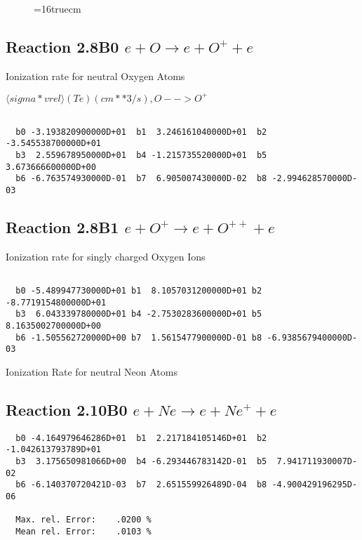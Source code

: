 \documentclass[12pt,dvipdfmx]{article}
\begin{document}
\begin{figure} \label{2.7B0}
\epsfxsize=16truecm
\end{figure}
\newpage

\subsection{
Reaction 2.8B0   $e + O \rightarrow e + O^+ + e  $
}

  Ionization rate for neutral Oxygen Atoms

  $ \langle sigma*vrel \rangle(Te)  (cm**3/s), O --> O^+$

\begin{small}\begin{verbatim}

  b0 -3.193820900000D+01  b1  3.246161040000D+01  b2 -3.545538700000D+01
  b3  2.559678950000D+01  b4 -1.215735520000D+01  b5  3.673666600000D+00
  b6 -6.763574930000D-01  b7  6.905007430000D-02  b8 -2.994628570000D-03

\end{verbatim}\end{small}
\subsection{
Reaction 2.8B1   $e + O^+ \rightarrow e + O^{++} + e  $
}

  Ionization rate for singly charged Oxygen Ions


\begin{small}\begin{verbatim}

  b0 -5.489947730000D+01 b1  8.1057031200000D+01 b2 -8.7719154800000D+01
  b3  6.043339780000D+01 b4 -2.7530283600000D+01 b5  8.1635002700000D+00
  b6 -1.505562720000D+00 b7  1.5615477900000D-01 b8 -6.9385679400000D-03

\end{verbatim}\end{small}

 Ionization Rate for neutral Neon Atoms

\subsection{
Reaction 2.10B0   $e + Ne \rightarrow e + Ne^+ + e  $
}

\begin{small}\begin{verbatim}
  b0 -4.164979646286D+01  b1  2.217184105146D+01  b2 -1.042613793789D+01
  b3  3.175650981066D+00  b4 -6.293446783142D-01  b5  7.941711930007D-02
  b6 -6.140370720421D-03  b7  2.651559926489D-04  b8 -4.900429196295D-06

  Max. rel. Error:    .0200 %
  Mean rel. Error:    .0103 %

\end{verbatim}\end{small}
\end{document}
